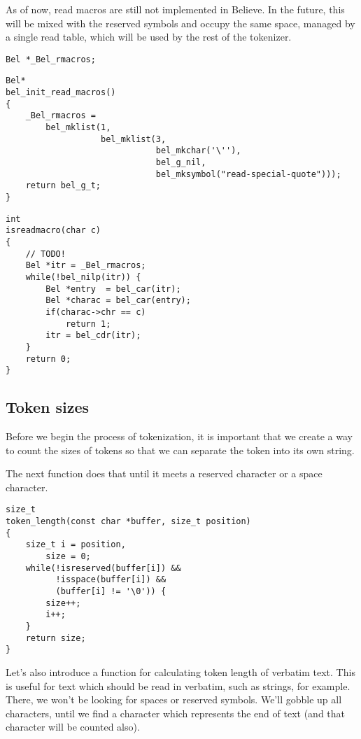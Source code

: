 \documentclass[openright,a4paper,twoside,12pt]{memoir}
\begin{document}
As of  now, read macros are  still not implemented in  Believe. In the
future, this  will be mixed with  the reserved symbols and  occupy the
same space, managed by a single read  table, which will be used by the
rest of the tokenizer.

\begin{verbatim}
Bel *_Bel_rmacros;
\end{verbatim}

\begin{verbatim}
Bel*
bel_init_read_macros()
{
    _Bel_rmacros =
        bel_mklist(1,
                   bel_mklist(3,
                              bel_mkchar('\''),
                              bel_g_nil,
                              bel_mksymbol("read-special-quote")));
    return bel_g_t;
}
\end{verbatim}

\begin{verbatim}
int
isreadmacro(char c)
{
    // TODO!
    Bel *itr = _Bel_rmacros;
    while(!bel_nilp(itr)) {
        Bel *entry  = bel_car(itr);
        Bel *charac = bel_car(entry);
        if(charac->chr == c)
            return 1;
        itr = bel_cdr(itr);
    }
    return 0;
}
\end{verbatim}

\subsection{Token sizes}
\label{sec:org8e6efde}

Before we begin  the process of tokenization, it is  important that we
create a way to count the sizes  of tokens so that we can separate the
token into its own string.

The next function  does that until it meets a  reserved character or a
space character.

\begin{verbatim}
size_t
token_length(const char *buffer, size_t position)
{
    size_t i = position,
        size = 0;
    while(!isreserved(buffer[i]) &&
          !isspace(buffer[i]) &&
          (buffer[i] != '\0')) {
        size++;
        i++;
    }
    return size;
}
\end{verbatim}

Let's  also  introduce a  function  for  calculating token  length  of
verbatim  text. This  is  useful  for text  which  should  be read  in
verbatim, such as strings, for example. There, we won't be looking for
spaces or reserved  symbols. We'll gobble up all  characters, until we
find a character which represents the  end of text (and that character
will be counted also).
\end{document}
